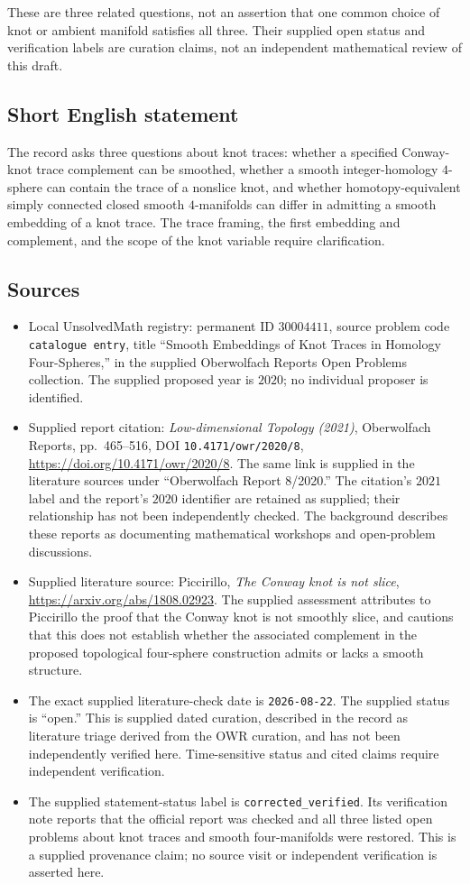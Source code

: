 \documentclass[11pt]{article}
\begin{document}
These are three related questions, not an assertion that one common choice of knot or ambient manifold satisfies all three. Their supplied open status and verification labels are curation claims, not an independent mathematical review of this draft.
\subsection{Short English statement}
The record asks three questions about knot traces: whether a specified Conway-knot trace complement can be smoothed, whether a smooth integer-homology \(4\)-sphere can contain the trace of a nonslice knot, and whether homotopy-equivalent simply connected closed smooth \(4\)-manifolds can differ in admitting a smooth embedding of a knot trace. The trace framing, the first embedding and complement, and the scope of the knot variable require clarification.
\subsection{Sources}
\begin{itemize}
\item Local UnsolvedMath registry: permanent ID \(30004411\), source problem code \texttt{catalogue entry}, title ``Smooth Embeddings of Knot Traces in Homology Four-Spheres,'' in the supplied Oberwolfach Reports Open Problems collection. The supplied proposed year is \(2020\); no individual proposer is identified.
\item Supplied report citation: \emph{Low-dimensional Topology (2021)}, Oberwolfach Reports, pp.\ 465--516, DOI \texttt{10.4171/owr/2020/8}, \url{https://doi.org/10.4171/owr/2020/8}. The same link is supplied in the literature sources under ``Oberwolfach Report 8/2020.'' The citation's \(2021\) label and the report's \(2020\) identifier are retained as supplied; their relationship has not been independently checked. The background describes these reports as documenting mathematical workshops and open-problem discussions.
\item Supplied literature source: Piccirillo, \emph{The Conway knot is not slice}, \url{https://arxiv.org/abs/1808.02923}. The supplied assessment attributes to Piccirillo the proof that the Conway knot is not smoothly slice, and cautions that this does not establish whether the associated complement in the proposed topological four-sphere construction admits or lacks a smooth structure.
\item The exact supplied literature-check date is \texttt{2026-08-22}. The supplied status is ``open.'' This is supplied dated curation, described in the record as literature triage derived from the OWR curation, and has not been independently verified here. Time-sensitive status and cited claims require independent verification.
\item The supplied statement-status label is \texttt{corrected\_verified}. Its verification note reports that the official report was checked and all three listed open problems about knot traces and smooth four-manifolds were restored. This is a supplied provenance claim; no source visit or independent verification is asserted here.
\end{itemize}
\end{document}
